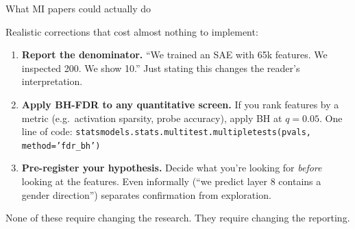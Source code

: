 \documentclass[aspectratio=169,11pt]{beamer}
\begin{document}
\begin{frame}{What MI papers could actually do}

{\small Realistic corrections that cost almost nothing to implement:}

\vspace{0.5em}

\begin{enumerate}\setlength\itemsep{5pt}
  \item {\small \textbf{Report the denominator.} ``We trained an SAE with 65k features. We inspected 200. We show 10.'' Just stating this changes the reader's interpretation.}
  \item {\small \textbf{Apply BH-FDR to any quantitative screen.} If you rank features by a metric (e.g.\ activation sparsity, probe accuracy), apply BH at $q = 0.05$. One line of code: \texttt{statsmodels.stats.multitest.multipletests(pvals, method='fdr\_bh')}}
  \item {\small \textbf{Pre-register your hypothesis.} Decide what you're looking for \emph{before} looking at the features. Even informally (``we predict layer 8 contains a gender direction'') separates confirmation from exploration.}
\end{enumerate}

\vspace{0.5em}

{\small None of these require changing the research. They require changing the reporting.}
\end{frame}


\begin{frame}[plain,label=part3]
\vfill
\begin{center}
  \setlength{\fboxrule}{2.5pt}%
\end{center}
\vfill
\end{frame}
\end{document}
